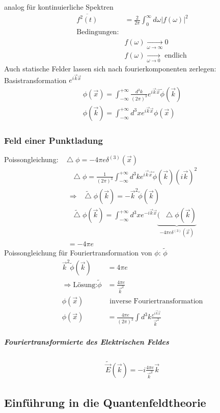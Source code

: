 \documentclass[a4paper]{article}
\newcommand*\laplace{\mathop{}\!\mathbin\bigtriangleup}
\begin{document}
analog für kontinuierliche Spektren
\begin{align}
\overline{f^2(t)}&=\frac{2}{2\pi}\int_0^\infty d\omega |f(\omega)|^2\\
\text{Bedingungen:}&\\
&f(\omega)\underset{\omega\rightarrow\infty}{\longrightarrow}0\\
&f(\omega)\underset{\omega\rightarrow0}{\longrightarrow} \text{ endlich}
\end{align}
Auch statische Felder lassen sich nach fourierkomponenten zerlegen:
Basistransformation $e^{i\vec{k}\vec{x}}$
\begin{align}
\phi(\vec{x})=\int_{-\infty}^{+\infty} \frac{d^3k}{(2\pi)^3}
e^{i\vec{k}\vec{x}}\tilde{\phi}(\vec{k})\\
\phi(\vec{k})=\int_{-\infty}^{+\infty} d^3x
e^{i\vec{k}\vec{x}}\phi(\vec{x})
\end{align}
\subsubsection{Feld einer Punktladung}
Poissongleichung: $\laplace\phi=-4\pi e \delta^{(3)}(\vec{x})$
\begin{align}
\laplace\phi=\frac{1}{(2\pi)^3}\int_{-\infty}^{+\infty} d^3k e^{i\vec{k}\vec{x}}
\tilde{\phi}(\vec{k})(i\vec{k})^2\\
\Rightarrow \tilde{\laplace \phi}(\vec{k})=-\vec{k}^2 \tilde{\phi}(\vec{k})\\
\tilde{\laplace \phi}(\vec{k})=\int_{-\infty}^{+\infty}d^3x e^{-i\vec{k}\vec{x}}
\underbrace{(\laplace\phi(\vec{k})}_{-4\pi e \delta^{(3)}(\vec{x})}\\
=-4\pi e
\end{align}
Poissongleichung für Fouriertransformation von $\phi$: $\tilde{\phi}$
\begin{align}
\vec{k}^2\tilde{\phi}(\vec{k})&=4\pi e\\
\Rightarrow \text{Lösung:} \tilde{\phi}&=\frac{4\pi e}{\vec{k}^2}\\
\phi(\vec{x})&\text{ inverse Fouriertransformation}\\
\phi(\vec{x})&=\frac{4\pi e}{(2\pi)^3}\int d^3k
\frac{e^{i\vec{k}\vec{x}}}{\vec{k}^2}
\end{align}
\subparagraph{Fouriertransformierte des Elektrischen Feldes}
\begin{align}
\tilde{\vec{E}}(\vec{k})=-i\frac{4\pi e}{\vec{k}^2}\vec{k}
\end{align}
\subsection{Einführung in die Quantenfeldtheorie}
\end{document}
